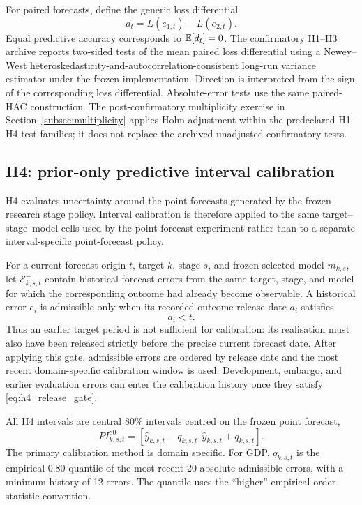 For paired forecasts, define the generic loss differential
\begin{equation}
    d_t=L(e_{1,t})-L(e_{2,t}).
    \label{eq:loss_diff}
\end{equation}
Equal predictive accuracy corresponds to $\mathbb{E}[d_t]=0$. The confirmatory H1--H3 archive reports two-sided tests of the mean paired loss differential using a Newey--West heteroskedasticity-and-autocorrelation-consistent long-run variance estimator under the frozen implementation. Direction is interpreted from the sign of the corresponding loss differential. Absolute-error tests use the same paired-HAC construction. The post-confirmatory multiplicity exercise in Section~\ref{subsec:multiplicity} applies Holm adjustment within the predeclared H1--H4 test families; it does not replace the archived unadjusted confirmatory tests.

\subsection{H4: prior-only predictive interval calibration}
\label{subsec:interval_calibration}

H4 evaluates uncertainty around the point forecasts generated by the frozen
research stage policy.  Interval calibration is therefore applied to the same
target--stage--model cells used by the point-forecast experiment rather than
to a separate interval-specific point-forecast policy.

For a current forecast origin \(t\), target \(k\), stage \(s\), and frozen
selected model \(m_{k,s}\), let
\(\mathcal{E}^{-}_{k,s,t}\) contain historical forecast errors from the same
target, stage, and model for which the corresponding outcome had already
become observable.  A historical error \(e_i\) is admissible only when its
recorded outcome release date \(a_i\) satisfies
\begin{equation}
    a_i < t.
    \label{eq:h4_release_gate}
\end{equation}
Thus an earlier target period is not sufficient for calibration: its
realisation must also have been released strictly before the precise current
forecast date.  After applying this gate, admissible errors are ordered by
release date and the most recent domain-specific calibration window is used.
Development, embargo, and earlier evaluation errors can enter the calibration
history once they satisfy \eqref{eq:h4_release_gate}.

All H4 intervals are central 80\% intervals centred on the frozen point
forecast,
\begin{equation}
    PI_{k,s,t}^{80}
    =
    \left[
        \widehat y_{k,s,t}-q_{k,s,t},
        \widehat y_{k,s,t}+q_{k,s,t}
    \right].
    \label{eq:pi80}
\end{equation}
The primary calibration method is domain specific.  For GDP, \(q_{k,s,t}\)
is the empirical 0.80 quantile of the most recent 20 absolute admissible
errors, with a minimum history of 12 errors.  The quantile uses the
``higher'' empirical order-statistic convention.

